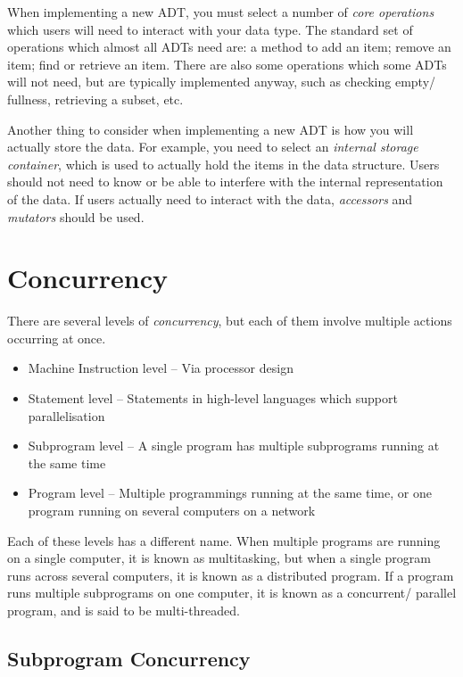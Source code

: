 When implementing a new ADT, you must select a number of \textit{core operations} which users will need to interact with
 your data type. The standard set of operations which almost all ADTs need are: a method to add an item; remove an item;
 find or retrieve an item. There are also some operations which some ADTs will not need, but are typically implemented
 anyway, such as checking empty/ fullness, retrieving a subset, etc.

Another thing to consider when implementing a new ADT is how you will actually store the data. For example, you need to
 select an \textit{internal storage container}, which is used to actually hold the items in the data structure. Users
 should not need to know or be able to interfere with the internal representation of the data. If users actually need to
 interact with the data, \textit{accessors} and \textit{mutators} should be used.

\section*{Concurrency}

There are several levels of \textit{concurrency}, but each of them involve multiple actions occurring at once.
\begin{itemize}
  \item Machine Instruction level -- Via processor design
  \item Statement level -- Statements in high-level languages which support parallelisation
  \item Subprogram level -- A single program has multiple subprograms running at the same time
  \item Program level -- Multiple programmings running at the same time, or one program running on several computers on
   a network
\end{itemize}

Each of these levels has a different name. When multiple programs are running on a single computer, it is known as
 multitasking, but when a single program runs across several computers, it is known as a distributed program. If a program
 runs multiple subprograms on one computer, it is known as a concurrent/ parallel program, and is said to be multi-threaded.

\subsection*{Subprogram Concurrency}

